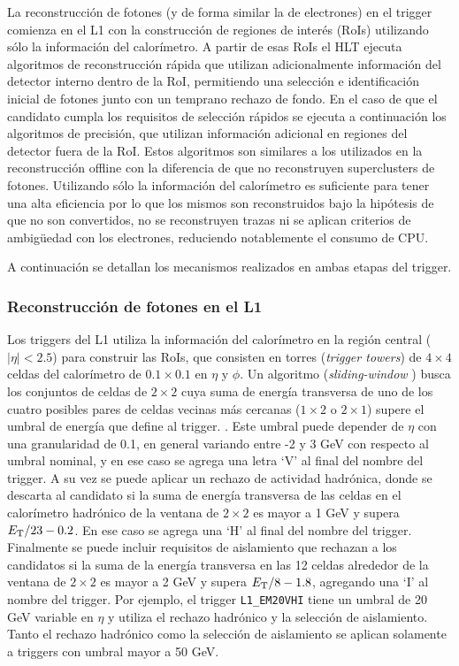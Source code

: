 La reconstrucción de fotones \cite{TRIG-2018-05} (y de forma similar la de electrones) en el trigger comienza en el L1 con la construcción de regiones de interés (RoIs) utilizando sólo la información del calorímetro. A partir de esas RoIs el HLT ejecuta algoritmos de reconstrucción rápida que utilizan adicionalmente información del detector interno dentro de la RoI, permitiendo una selección e identificación inicial de fotones junto con un temprano rechazo de fondo. En el caso de que el candidato cumpla los requisitos de selección rápidos se ejecuta a continuación los algoritmos de precisión, que utilizan información adicional en regiones del detector fuera de la RoI. Estos algoritmos son similares a los utilizados en la reconstrucción offline con la diferencia de que no reconstruyen superclusters de fotones. Utilizando sólo la información del calorímetro es suficiente para tener una alta eficiencia por lo que los mismos son reconstruidos bajo la hipótesis de que no son convertidos, no se reconstruyen trazas ni se aplican criterios de ambigüedad con los electrones, reduciendo notablemente el consumo de CPU. 

A continuación se detallan los mecanismos realizados en ambas etapas del trigger.

\subsubsection{Reconstrucción de fotones en el L1}

Los triggers del L1 
utiliza la información del calorímetro en la región central ($|\eta|<2.5$) para construir las RoIs, que consisten en torres (\textit{trigger towers}) de $4\times4$ celdas del calorímetro de $0.1\times0.1$ en $\eta$ y $\phi$. Un algoritmo (\textit{sliding-window} \cite{Lampl:1099735}) busca los conjuntos de celdas de $2\times2$ cuya suma de energía transversa de uno de los cuatro posibles pares de celdas vecinas más cercanas ($1\times2$ o $2\times1$) supere el umbral de energía que define al trigger. 
 . 
Este umbral puede depender de $\eta$ con una granularidad de 0.1, en general variando entre -2 y 3 GeV con respecto al umbral nominal, y en ese caso se agrega una letra `V' al final del nombre del trigger. A su vez se puede aplicar un rechazo de actividad hadrónica, donde se descarta al candidato si la suma de energía transversa de las celdas en el calorímetro hadrónico de la ventana de $2\times2$ es mayor a 1 GeV y supera $E_{\text{T}}/23-0.2$. En ese caso se agrega una `H' al final del nombre del trigger. Finalmente se puede incluir requisitos de aislamiento que rechazan a los candidatos si la suma de la energía transversa en las 12 celdas alrededor de la ventana de $2\times2$ es mayor a 2 GeV y supera $E_{\text{T}}/8-1.8$, agregando una `I' al nombre del trigger. Por ejemplo, el trigger \texttt{L1\_EM20VHI} tiene un umbral de 20 GeV variable en $\eta$ y utiliza el rechazo hadrónico y la selección de aislamiento. Tanto el rechazo hadrónico como la selección de aislamiento se aplican solamente a triggers con umbral mayor a 50 GeV.

